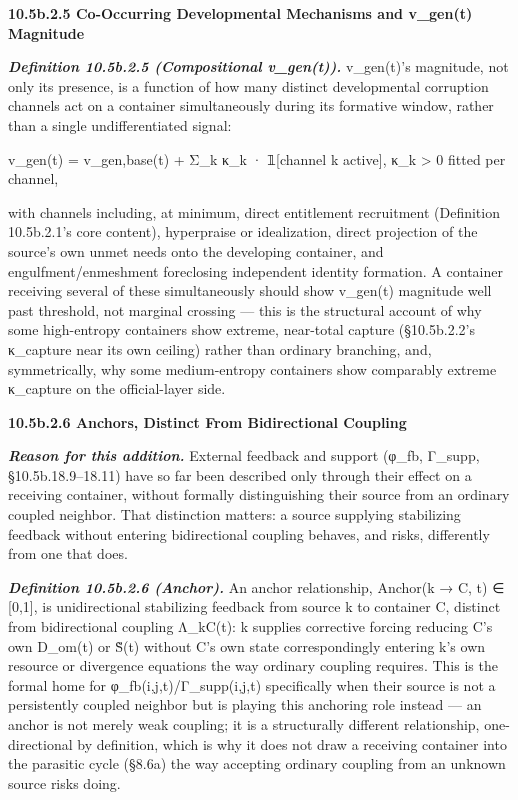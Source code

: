 \documentclass[
]{article}
\begin{document}
\textbf{10.5b.2.5 Co-Occurring Developmental Mechanisms and v\_gen(t)
Magnitude}

\emph{\textbf{Definition 10.5b.2.5 (Compositional v\_gen(t)).}}
v\_gen(t)'s magnitude, not only its presence, is a function of how many
distinct developmental corruption channels act on a container
simultaneously during its formative window, rather than a single
undifferentiated signal:

v\_gen(t) = v\_gen,base(t) + Σ\_k κ\_k · 𝟙{[}channel k active{]}, κ\_k
\textgreater{} 0 fitted per channel,

with channels including, at minimum, direct entitlement recruitment
(Definition 10.5b.2.1's core content), hyperpraise or idealization,
direct projection of the source's own unmet needs onto the developing
container, and engulfment/enmeshment foreclosing independent identity
formation. A container receiving several of these simultaneously should
show v\_gen(t) magnitude well past threshold, not marginal crossing ---
this is the structural account of why some high-entropy containers show
extreme, near-total capture (§10.5b.2.2's κ\_capture near its own
ceiling) rather than ordinary branching, and, symmetrically, why some
medium-entropy containers show comparably extreme κ\_capture on the
official-layer side.

\textbf{10.5b.2.6 Anchors, Distinct From Bidirectional Coupling}

\emph{\textbf{Reason for this addition.}} External feedback and support
(φ\_fb, Γ\_supp, §10.5b.18.9--18.11) have so far been described only
through their effect on a receiving container, without formally
distinguishing their source from an ordinary coupled neighbor. That
distinction matters: a source supplying stabilizing feedback without
entering bidirectional coupling behaves, and risks, differently from one
that does.

\emph{\textbf{Definition 10.5b.2.6 (Anchor).}} An anchor relationship,
Anchor(k → C, t) ∈ {[}0,1{]}, is unidirectional stabilizing feedback
from source k to container C, distinct from bidirectional coupling
Λ\_kC(t): k supplies corrective forcing reducing C's own D\_om(t) or
S̃(t) without C's own state correspondingly entering k's own resource or
divergence equations the way ordinary coupling requires. This is the
formal home for φ\_fb(i,j,t)/Γ\_supp(i,j,t) specifically when their
source is not a persistently coupled neighbor but is playing this
anchoring role instead --- an anchor is not merely weak coupling; it is
a structurally different relationship, one-directional by definition,
which is why it does not draw a receiving container into the parasitic
cycle (§8.6a) the way accepting ordinary coupling from an unknown source
risks doing.
\end{document}
